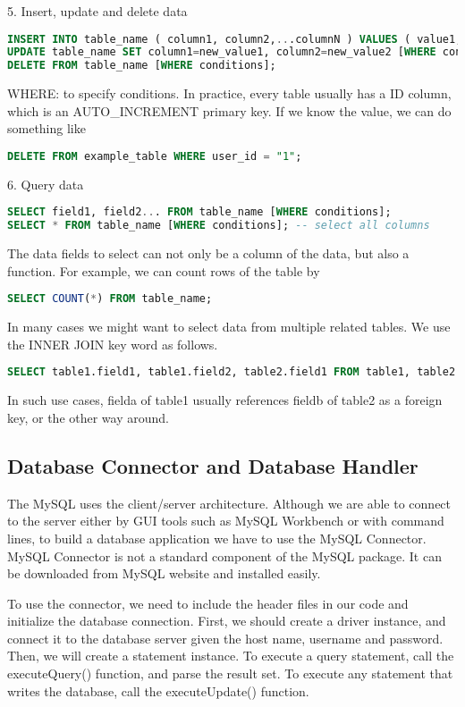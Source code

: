 5. Insert, update and delete data
\begin{lstlisting}[language=SQL]
INSERT INTO table_name ( column1, column2,...columnN ) VALUES ( value1, value2,...valueN );
UPDATE table_name SET column1=new_value1, column2=new_value2 [WHERE conditions];
DELETE FROM table_name [WHERE conditions];
\end{lstlisting}

WHERE: to specify conditions. In practice, every table usually has a ID column, which is an AUTO\_INCREMENT primary key. If we know the value, we can do something like
\begin{lstlisting}[language=SQL]
DELETE FROM example_table WHERE user_id = "1";
\end{lstlisting}

6. Query data
\begin{lstlisting}[language=SQL]
SELECT field1, field2... FROM table_name [WHERE conditions];
SELECT * FROM table_name [WHERE conditions]; -- select all columns
\end{lstlisting}

The data fields to select can not only be a column of the data, but also a function. For example, we can count rows of the table by
\begin{lstlisting}[language=SQL]
SELECT COUNT(*) FROM table_name; 
\end{lstlisting}

In many cases we might want to select data from multiple related tables. We use the INNER JOIN key word as follows.
\begin{lstlisting}[language=SQL]
SELECT table1.field1, table1.field2, table2.field1 FROM table1, table2 WHERE table1.field_a = table2.field_b;
\end{lstlisting}
In such use cases, fielda of table1 usually references fieldb of table2 as a foreign key, or the other way around.

\subsection{Database Connector and Database Handler}
The MySQL uses the client/server architecture. Although we are able to connect to the server either by GUI tools such as MySQL Workbench or with command lines, to build a database application we have to use the MySQL Connector. MySQL Connector is not a standard component of the MySQL package. It can be downloaded from MySQL website and installed easily.

To use the connector, we need to include the header files in our code and initialize the database connection. First, we should create a driver instance, and connect it to the database server given the host name, username and password. Then, we will create a statement instance. To execute a query statement, call the executeQuery() function, and parse the result set. To execute any statement that writes the database, call the executeUpdate() function.

